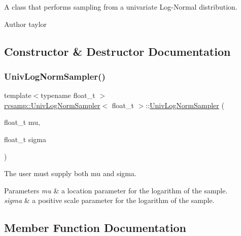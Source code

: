 A class that performs sampling from a univariate Log-\/\+Normal distribution. 

\begin{DoxyAuthor}{Author}
taylor 
\end{DoxyAuthor}


\subsection{Constructor \& Destructor Documentation}
\mbox{\label{classrvsamp_1_1UnivLogNormSampler_acdec4ea77c92dad9603a49201997d4b7}} 
\subsubsection{\texorpdfstring{Univ\+Log\+Norm\+Sampler()}{UnivLogNormSampler()}}
{\footnotesize\ttfamily template$<$typename float\+\_\+t $>$ \\
\hyperlink{classrvsamp_1_1UnivLogNormSampler}{rvsamp\+::\+Univ\+Log\+Norm\+Sampler}$<$ float\+\_\+t $>$\+::\hyperlink{classrvsamp_1_1UnivLogNormSampler}{Univ\+Log\+Norm\+Sampler} (\begin{DoxyParamCaption}\item[{float\+\_\+t}]{mu,  }\item[{float\+\_\+t}]{sigma }\end{DoxyParamCaption})}



The user must supply both mu and sigma. 


\begin{DoxyParams}{Parameters}
{\em mu} & a location parameter for the logarithm of the sample. \\
\hline
{\em sigma} & a positive scale parameter for the logarithm of the sample. \\
\hline
\end{DoxyParams}


\subsection{Member Function Documentation}
\mbox{\label{classrvsamp_1_1UnivLogNormSampler_a816c87875ed08b4b90f9fbe3fd4bda88}} 

